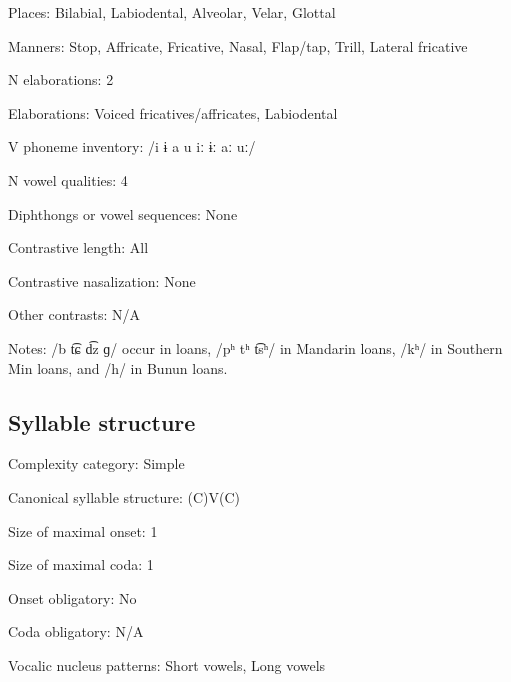 {\begin{appendixdesc}
\item[Places:] Bilabial, Labiodental, Alveolar, Velar, Glottal

\item[Manners:] Stop, Affricate, Fricative, Nasal, Flap/tap, Trill, Lateral fricative

\item[N elaborations:] 2

\item[Elaborations:] Voiced fricatives/affricates, Labiodental

\item[V phoneme inventory:] /i ɨ a u iː ɨː aː uː/

\item[N vowel qualities:] 4

\item[Diphthongs or vowel sequences:] None

\item[Contrastive length:] All

\item[Contrastive nasalization:] None

\item[Other contrasts:] N/A

\item[Notes:] /b t͡ɕ d͡z ɡ/ occur in  loans, /pʰ tʰ t͡sʰ/ in Mandarin loans, /kʰ/ in Southern Min loans, and /h/ in Bunun loans.
\end{appendixdesc}
\subsection*{Syllable structure}
\begin{appendixdesc}

\item[Complexity category:] Simple

\item[Canonical syllable structure:] (C)V(C) \citep[32--33]{Pan2012}

\item[Size of maximal onset:] 1

\item[Size of maximal coda:] 1

\item[Onset obligatory:] No

\item[Coda obligatory:] N/A

\item[Vocalic nucleus patterns:] Short vowels, Long vowels


\end{appendixdesc}}
